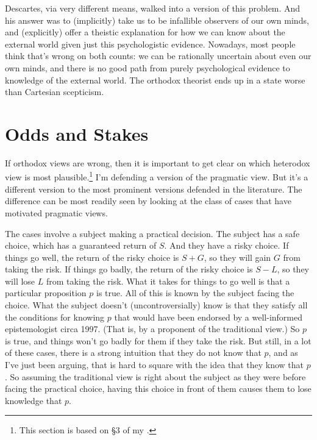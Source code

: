\documentclass[11pt,]{book}
\let\rmarkdownfootnote\footnote%
\def\footnote{\protect\rmarkdownfootnote}
\begin{document}
Descartes, via very different means, walked into a version of this problem. And his answer was to (implicitly) take us to be infallible observers of our own minds, and (explicitly) offer a theistic explanation for how we can know about the external world given just this psychologistic evidence. Nowadays, most people think that's wrong on both counts: we can be rationally uncertain about even our own minds, and there is no good path from purely psychological evidence to knowledge of the external world. The orthodox theorist ends up in a state worse than Cartesian scepticism.

\hypertarget{oddsandstakes}{%
\section{Odds and Stakes}\label{oddsandstakes}}

If orthodox views are wrong, then it is important to get clear on which heterodox view is most plausible.\footnote{This section is based on §3 of my \citeyearpar{Weatherson2016}.} I'm defending a version of the pragmatic view. But it's a different version to the most prominent versions defended in the literature. The difference can be most readily seen by looking at the class of cases that have motivated pragmatic views.

The cases involve a subject making a practical decision. The subject has a safe choice, which has a guaranteed return of \(S\). And they have a risky choice. If things go well, the return of the risky choice is \(S + G\), so they will gain \(G\) from taking the risk. If things go badly, the return of the risky choice is \(S - L\), so they will lose \(L\) from taking the risk. What it takes for things to go well is that a particular proposition \(p\) is true. All of this is known by the subject facing the choice. What the subject doesn't (uncontroversially) know is that they satisfy all the conditions for knowing \(p\) that would have been endorsed by a well-informed epistemologist circa 1997. (That is, by a proponent of the traditional view.) So \(p\) is true, and things won't go badly for them if they take the risk. But still, in a lot of these cases, there is a strong intuition that they do not know that \(p\), and as I've just been arguing, that is hard to square with the idea that they know that \(p\). So assuming the traditional view is right about the subject as they were before facing the practical choice, having this choice in front of them causes them to lose knowledge that \(p\).
\end{document}

